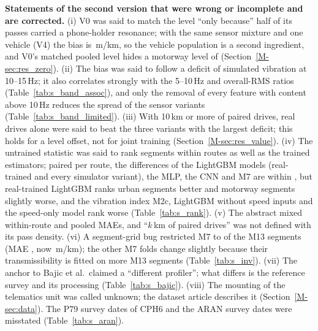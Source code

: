 \documentclass[onecolumn,10pt]{IEEEtran}
\begin{document}
\textbf{Statements of the second version that were wrong or incomplete and are corrected.}
(i) V0 was said to match the level ``only because'' half of its passes carried a phone-holder resonance; with the same sensor mixture and one vehicle (V4) the bias is \vvVfourBias\,m/km, so the vehicle population is a second ingredient, and V0's matched pooled level hides a motorway level of \ldVzeroMotorway{} (Section~\ref{M-sec:res_zero}).
(ii) The bias was said to follow a deficit of simulated vibration at 10--15\,Hz; it also correlates strongly with the 5--10\,Hz and overall-RMS ratios (Table~\ref{tab:s_band_assoc}), and only the removal of every feature with content above 10\,Hz reduces the spread of the sensor variants (Table~\ref{tab:s_band_limited}).
(iii) With 10\,km or more of paired drives, real drives alone were said to beat the three variants with the largest deficit; this holds for a level offset, not for joint training (Section~\ref{M-sec:res_value}).
(iv) The untrained statistic was said to rank segments within routes as well as the trained estimators; paired per route, the differences of the LightGBM models (real-trained and every simulator variant), the MLP, the CNN and M7 are within \rpAbsMax, but real-trained LightGBM ranks urban segments better and motorway segments slightly worse, and the vibration index M2c, LightGBM without speed inputs and the speed-only model rank worse (Table~\ref{tab:s_rank}).
(v) The abstract mixed within-route and pooled MAEs, and ``$k$\,km of paired drives'' was not defined with its pass density.
(vi) A segment-grid bug restricted M7 to \mtMwThirteenOldSeg{} of the \mtMwThirteenNewSeg{} M13 segments (MAE \mtMwThirteenOldMae, now \mtMwThirteenNewMae\,m/km); the other M7 folds change slightly because their transmissibility is fitted on more M13 segments (Table~\ref{tab:s_inv}).
(vii) The anchor to Bajic et al.\ claimed a ``different profiler''; what differs is the reference survey and its processing (Table~\ref{tab:s_bajic}).
(viii) The mounting of the telematics unit was called unknown; the dataset article describes it (Section~\ref{M-sec:data}). The P79 survey dates of CPH6 and the ARAN survey dates were misstated (Table~\ref{tab:s_aran}).
\end{document}
